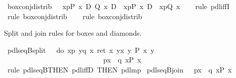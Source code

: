\begin{isabellebody}
\isamarkuptrue%
\ box{\isacharunderscore}conj{\isacharunderscore}distrib{\isacharcolon}\ {\isachardoublequote}{\isasymturnstile}\ {\isacharbrackleft}{\isacharhash}\ x{\isasymleftarrow}p{\isacharbrackright}{\isacharparenleft}P\ x\ {\isasymand}\isactrlsub D\ Q\ x{\isacharparenright}\ {\isasymlongleftrightarrow}\isactrlsub D\ {\isacharbrackleft}{\isacharhash}\ x{\isasymleftarrow}p{\isacharbrackright}{\isacharparenleft}P\ x{\isacharparenright}\ {\isasymand}\isactrlsub D\ {\isacharbrackleft}{\isacharhash}\ x{\isasymleftarrow}p{\isacharbrackright}{\isacharparenleft}Q\ x{\isacharparenright}{\isachardoublequote}\isanewline
\ \ \isamarkupfalse%
\ {\isacharparenleft}rule\ pdl{\isacharunderscore}iffI{\isacharparenright}\isanewline
\ \ \isamarkupfalse%
\ {\isacharparenleft}rule\ box{\isacharunderscore}conj{\isacharunderscore}distrib{}{\isacharparenright}\isanewline
\ \ \isamarkupfalse%
\ {\isacharparenleft}rule\ box{\isacharunderscore}conj{\isacharunderscore}distrib{}{\isacharparenright}\isanewline
\isamarkupfalse%
\isamarkupfalse%
%
\begin{isamarkuptext}%
Split and join rules for boxes and diamonds.%
\end{isamarkuptext}%
\isamarkuptrue%
\ pdl{\isacharunderscore}seqB{\isacharunderscore}split{\isacharcolon}\ {\isachardoublequote}{\isasymturnstile}\ {\isacharbrackleft}{\isacharhash}\ do\ {\isacharbraceleft}x{\isasymleftarrow}p{\isacharsemicolon}\ y{\isasymleftarrow}q\ x{\isacharsemicolon}\ ret\ {\isacharparenleft}x{\isacharcomma}\ y{\isacharparenright}{\isacharbraceright}{\isacharbrackright}{\isacharparenleft}{\isasymlambda}{\isacharparenleft}x{\isacharcomma}\ y{\isacharparenright}{\isachardot}\ P\ x\ y{\isacharparenright}\ \isanewline
\ \ \ \ \ \ \ \ \ \ \ \ \ \ \ \ \ \ \ \ \ \ \ \ \ {\isasymLongrightarrow}\ {\isasymturnstile}\ {\isacharbrackleft}{\isacharhash}\ p{\isacharbrackright}{\isacharparenleft}{\isasymlambda}x{\isachardot}\ {\isacharbrackleft}{\isacharhash}\ q\ x{\isacharbrackright}P\ x{\isacharparenright}{\isachardoublequote}\isanewline
\ \ \isamarkupfalse%
\ {\isacharparenleft}rule\ pdl{\isacharunderscore}seqB{\isacharbrackleft}THEN\ pdl{\isacharunderscore}iffD{}{\isacharcomma}\ THEN\ pdl{\isacharunderscore}mp{\isacharbrackright}{\isacharparenright}\isanewline
\isanewline
\isamarkupfalse%
\ pdl{\isacharunderscore}seqB{\isacharunderscore}join{\isacharcolon}\ {\isachardoublequote}{\isasymturnstile}\ {\isacharbrackleft}{\isacharhash}\ p{\isacharbrackright}{\isacharparenleft}{\isasymlambda}x{\isachardot}\ {\isacharbrackleft}{\isacharhash}\ q\ x{\isacharbrackright}P\ x{\isacharparenright}\ \isanewline

\end{isabellebody}
